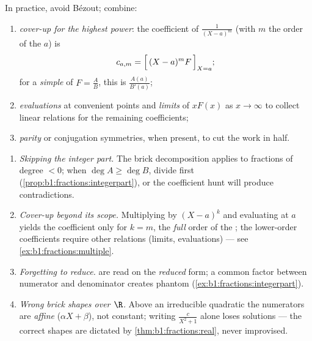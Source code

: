 \begin{method}\label{met:b1:fractions:compute}
In practice, avoid Bézout; combine:
\begin{enumerate}
  \item \emph{cover-up for the highest power}: the coefficient of
        $\frac{1}{(X-a)^m}$ (with $m$ the order of the  $a$) is
        \[
        c_{a,m} = \Bigl[\,(X - a)^m F\,\Bigr]_{X = a};
        \]
        for a \emph{simple}  of $F = \frac AB$, this is
        $\frac{A(a)}{B'(a)}$;
  \item \emph{evaluations} at convenient points and \emph{limits} of
        $xF(x)$ as $x \to \infty$ to collect linear relations for the
        remaining coefficients;
  \item \emph{parity} or conjugation symmetries, when present, to cut
        the work in half.
\end{enumerate}
\end{method}

\begin{remark}\label{rem:b1:fractions:pitfalls}
\begin{enumerate}
  \item \emph{Skipping the integer part.} The brick decomposition
        applies to fractions of degree $< 0$; when $\deg A \geq
        \deg B$, divide first
        (\cref{prop:b1:fractions:integerpart}), or the
        coefficient hunt will produce contradictions.
  \item \emph{Cover-up beyond its scope.} Multiplying by
        $(X - a)^k$ and evaluating at $a$ yields the coefficient
        only for $k = m$, the \emph{full} order of the ; the
        lower-order coefficients require other relations (limits,
        evaluations) --- see \cref{ex:b1:fractions:multiple}.
  \item \emph{Forgetting to reduce.}  are read on the
        \emph{reduced} form; a common factor between numerator
        and denominator creates phantom 
        (\cref{ex:b1:fractions:integerpart}).
  \item \emph{Wrong brick shapes over $\R$.} Above an irreducible
        quadratic the numerators are \emph{affine} ($\alpha X +
        \beta$), not constant; writing $\frac{c}{X^2 + 1}$ alone
        loses solutions --- the correct shapes are dictated by
        \cref{thm:b1:fractions:real}, never improvised.
\end{enumerate}
\end{remark}

